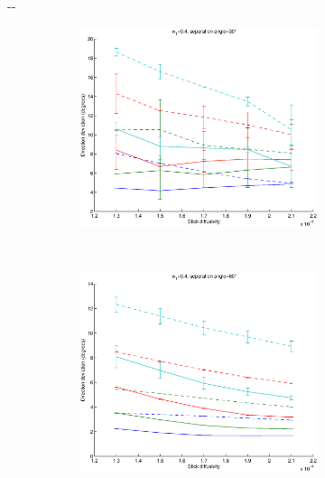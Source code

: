 \documentclass{article}
\begin{document}
\begin{figure}[H]
\begin{adjustwidth}{-\oddsidemargin}{-\rightmargin}
    \begin{subfigure}{0.8\paperwidth}
      \begin{subfigure}{0.3\textwidth}
        \centering
        \includegraphics[width=\textwidth]{figures/synth_modbas_weights__snr=20__w1=4__angle=30.eps}
      \end{subfigure}
      ~
      \begin{subfigure}{0.3\textwidth}
        \centering
        \includegraphics[width=\textwidth]{figures/synth_modbas_weights__snr=20__w1=4__angle=60.eps}
      \end{subfigure}

\end{subfigure}
\end{adjustwidth}
\end{figure}
\end{document}

